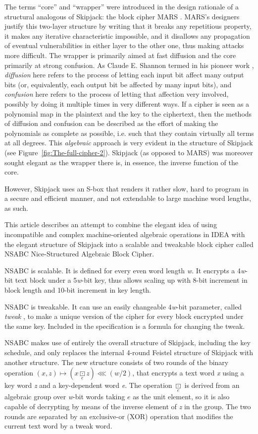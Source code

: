 \documentclass[a4paper,oneside,english]{amsart}
\numberwithin{equation}{section}
\numberwithin{figure}{section}
\begin{document}
The terms {}``core'' and {}``wrapper'' were introduced in the
design rationale of a structural analogous of Skipjack: the block
cipher MARS \cite{IBM98}. MARS's designers justify this two-layer
structure by writing that it breaks any repetitious property, it makes
any iterative characteristic impossible, and it disallows any propagation
of eventual vulnerabilities in either layer to the other one, thus
making attacks more difficult. The wrapper is primarily aimed at fast
diffusion and the core primarily at strong confusion. As Claude E.
Shannon termed in his pioneer work \cite{Sha49}, \emph{diffusion}
here refers to the process of letting each input bit affect many output
bits (or, equivalently, each output bit be affected by many input
bits), and \emph{confusion} here refers to the process of letting
that affection very involved, possibly by doing it multiple times
in very different ways. If a cipher is seen as a polynomial map in
the plaintext and the key to the ciphertext, then the methods of diffusion
and confusion can be described as the effort of making the polynomials
as complete as possible, i.e. such that they contain virtually all
terms at all degrees. This \emph{algebraic} approach is very evident
in the structure of Skipjack (see Figure~\ref{fig:The-full-cipher-2}).
Skipjack (as opposed to MARS) was moreover sought elegant as the wrapper
there is, in essence, the inverse function of the core.

However, Skipjack uses an S-box that renders it rather slow, hard
to program in a secure and efficient manner, and not extendable to
large machine word lengths, as such.

This article describes an attempt to combine the elegant idea of using
incompatible and complex machine-oriented algebraic operations in
IDEA with the elegant structure of Skipjack into a scalable and tweakable
block cipher called NSABC \textemdash{} Nice-Structured Algebraic
Block Cipher.

NSABC is scalable. It is defined for every even word length \emph{w}.
It encrypts a 4\emph{w}-bit text block under a 5\emph{w}-bit key,
thus allows scaling up with 8-bit increment in block length and 10-bit
increment in key length.

NSABC is tweakable. It can use an easily changeable 4\emph{w}-bit
parameter, called \emph{tweak} \cite{LRW02}, to make a unique version
of the cipher for every block encrypted under the same key. Included
in the specification is a formula for changing the tweak.

NSABC makes use of entirely the overall structure of Skipjack, including
the key schedule, and only replaces the internal 4-round Feistel structure
of Skipjack with another structure. The new structure consists of
two rounds of the binary operation $(x,z)\mapsto(x\underset{e}{\boxdot}z)\lll(w/2)$,
that encrypts a text word \emph{x} using a key word \emph{z} and a
key-dependent word \emph{e}. The operation $\underset{e}{\boxdot}$
is derived from an algebraic group over \emph{w}-bit words taking
$e$ as the unit element, so it is also capable of decrypting by means
of the inverse element of \emph{z} in the group. The two rounds are
separated by an exclusive-or (XOR) operation that modifies the current
text word by a tweak word.
\end{document}
